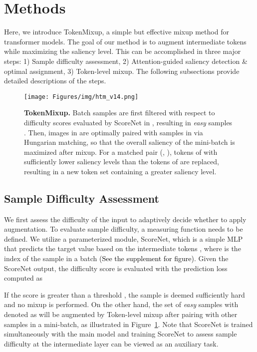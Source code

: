 \documentclass{article}
\begin{document}
 \section{Methods}
\label{section:method}
Here, we introduce TokenMixup, a simple but effective mixup method for transformer models.
The goal of our method is to augment intermediate tokens while maximizing the saliency level.
This can be accomplished in three major steps: 1) Sample difficulty assessment, 2) Attention-guided saliency detection \& optimal assignment, 3) Token-level mixup.
The following subsections provide detailed descriptions of the steps.


\begin{figure}[t]
\begin{center}
\texttt{[image: Figures/img/htm\_v14.png]}
\end{center}
\vspace{-4mm}
\caption{\footnotesize \textbf{TokenMixup.} Batch samples  are first filtered with respect to difficulty scores evaluated by ScoreNet in , resulting in \textit{easy} samples . 
Then, images in  are optimally paired with samples in  via Hungarian matching, so that the overall saliency of the mini-batch is maximized after mixup. 
For a matched pair (, ), tokens of  with sufficiently lower saliency levels than the tokens of  are replaced, resulting in a new token set  containing a greater saliency level.}
\label{fig:htm}
\end{figure} 
\subsection{Sample Difficulty Assessment}
\label{sec:scorenet}
We first assess the difficulty of the input to adaptively decide whether to apply augmentation.
To evaluate sample difficulty, a measuring function  needs to be defined.
We utilize a parameterized module, ScoreNet, which is a simple MLP that predicts the target value  based on the intermediate tokens , where  is the index of the sample in a batch \textcolor{black}{(See the supplement for figure)}.
Given the ScoreNet output, the difficulty score is evaluated with the prediction loss computed as

If the score is greater than a threshold , the sample is deemed sufficiently hard and no mixup is performed.
On the other hand, the set of \textit{easy} samples with  denoted as  will be augmented by Token-level mixup after pairing with other samples in a mini-batch, as illustrated in Figure~\ref{fig:htm}.
Note that ScoreNet is trained simultaneously with the main model and training ScoreNet to assess sample difficulty at the intermediate layer can be viewed as an auxiliary task. 
\end{document}
